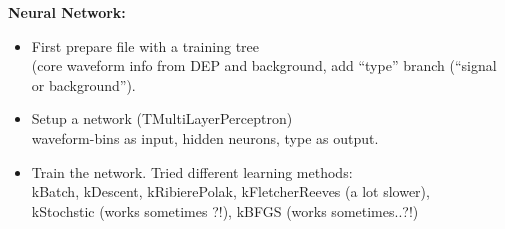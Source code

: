 \documentclass[landscape]{slides}
\begin{document}
\begin{slide}

\textbf{Neural Network:}

\begin{itemize}

\item First prepare file with a training tree \\
     (core waveform info from DEP and background, add ``type'' branch (``signal or background'').

\item Setup a network (TMultiLayerPerceptron)  \\
      waveform-bins as input, hidden neurons, type as output.

\item Train the network. Tried different learning methods: \\
  kBatch, kDescent, kRibierePolak, kFletcherReeves (a lot slower), 
  \\ kStochstic (works sometimes ?!), kBFGS (works sometimes..?!)

\end{itemize}

\end{slide}



\end{document}
